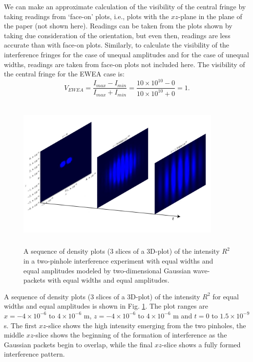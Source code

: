 \documentclass[12pt]{article}       %
\begin{document}
We can make an approximate calculation of the visibility of the central fringe by taking readings from `face-on' plots, i.e., plots with the $xz$-plane  in the plane of the paper (not shown here). Readings can be taken from the plots shown by taking due consideration of the orientation, but even then, readings are less accurate than with face-on plots. Similarly, to calculate the visibility of the interference fringes for the case of unequal amplitudes and for the case of unequal widths, readings are taken from face-on plots not included here. The visibility of the central fringe for the EWEA case is:
\[
V_{EWEA}=\frac{I_{max}-I_{min}}{I_{max}+I_{min}}=\frac{10\times 10^{10}-0}{10\times 10^{10}+0}=1.
\]
\begin{figure}[h]
\unitlength=1in 
\hspace*{1.0in}\includegraphics[width=4in,height=3in]  {figure7.jpg} 
\caption{A sequence of density plots (3 slices of a 3D-plot) of the intensity $R^2$  in a two-pinhole interference experiment with  equal widths and equal amplitudes modeled by  two-dimensional Gaussian wave-packets with equal widths and equal amplitudes.\label{INT2DGDP}}
\end{figure}
A sequence of density plots (3 slices of a 3D-plot) of the intensity $R^2$ for equal widths and equal amplitudes is shown in Fig. \ref{INT2DGDP}. The plot  ranges are $x=-4\times 10^{-6}$ to $4\times 10^{-6}$ m, $z=-4\times 10^{-6}$ to $4\times 10^{-6}$ m  and $t=0$ to $1.5\times 10^{-9}$ s.  The first $xz$-slice shows the high intensity emerging from the two pinholes, the middle $xz$-slice shows the beginning of the formation of interference as the Gaussian packets begin to overlap, while the final $xz$-slice shows a fully formed interference pattern.
\end{document}
